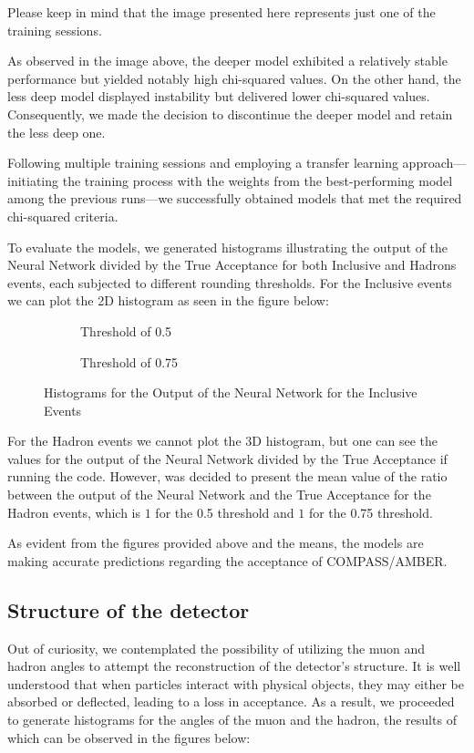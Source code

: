 \documentclass{article}
\begin{document}
Please keep in mind that the image presented here represents just one of the training sessions.

As observed in the image above, the deeper model exhibited a relatively stable performance but yielded notably high chi-squared values. On the other hand, the less deep model displayed instability but delivered lower chi-squared values. Consequently, we made the decision to discontinue the deeper model and retain the less deep one.

Following multiple training sessions and employing a transfer learning approach—initiating the training process with the weights from the best-performing model among the previous runs—we successfully obtained models that met the required chi-squared criteria.

To evaluate the models, we generated histograms illustrating the output of the Neural Network divided by the True Acceptance for both Inclusive and Hadrons events, each subjected to different rounding thresholds. For the Inclusive events we can plot the 2D histogram as seen in the figure below:
\begin{figure}[H]
    \centering
    \begin{subfigure}[b]{0.45\textwidth}
        \centering
        \caption{Threshold of 0.5}
        \label{fig:inclusive_output_t050}
    \end{subfigure}
    \hfill
    \begin{subfigure}[b]{0.45\textwidth}
        \centering
        \caption{Threshold of 0.75}
        \label{fig:inclusive_output_t075}
    \end{subfigure}
    \caption{Histograms for the Output of the Neural Network for the Inclusive Events}
\end{figure}

For the Hadron events we cannot plot the 3D histogram, but one can see the values for the output of the Neural Network divided by the True Acceptance if running the code.
However, was decided to present the mean value of the ratio between the output of the Neural Network and the True Acceptance for the Hadron events, which is $1$ for the 0.5 threshold and $1$ for the 0.75 threshold.


As evident from the figures provided above and the means, the models are making accurate predictions regarding the acceptance of COMPASS/AMBER.

\subsection{Structure of the detector}
Out of curiosity, we contemplated the possibility of utilizing the muon and hadron angles to attempt the reconstruction of the detector's structure. It is well understood that when particles interact with physical objects, they may either be absorbed or deflected, leading to a loss in acceptance. As a result, we proceeded to generate histograms for the angles of the muon and the hadron, the results of which can be observed in the figures below:
\end{document}

